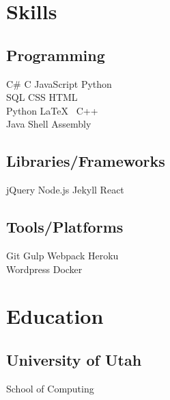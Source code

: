 \documentclass[]{plushcv}
\begin{document}
\begin{minipage}[t]{0.25\textwidth} 


\section{Skills}
\subsection{Programming}
\sectionsep
{}
C\# \textbullet{} C \textbullet{} JavaScript \textbullet{} Python    \\ SQL \textbullet{} CSS \textbullet{} HTML \textbullet{} \\
\sectionsep
{}
Python \textbullet{} \LaTeX\ \textbullet{}  C++  \\
\sectionsep
{}
Java \textbullet{}  Shell \textbullet{} Assembly \\
\sectionsep
\sectionsep
\subsection{Libraries/Frameworks}
\sectionsep
jQuery \textbullet{} Node.js \textbullet{} Jekyll \textbullet{} React \\
\sectionsep
\sectionsep
\subsection{Tools/Platforms}
\sectionsep
Git \textbullet{} Gulp \textbullet{} Webpack \textbullet{} Heroku    \\ Wordpress \textbullet{} Docker \\

\sectionsep


\section{Education} 
\subsection{University of Utah}
School of Computing \\


\end{minipage}
\end{document}
